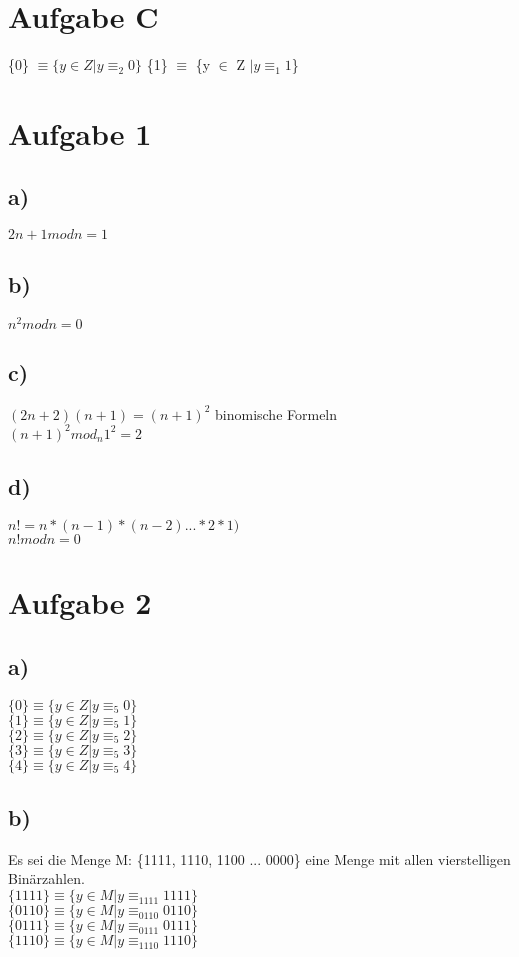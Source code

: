 \documentclass{article}
\begin{document}
	\section*{Aufgabe C}
	\{0\} $\equiv \{y \in Z | y \equiv_2 0 \}$
	\{1\} $\equiv$ \{y $\in$ Z $| y \equiv_1 1$\}
	
	\section*{Aufgabe 1}
	\subsection*{a)}
	$2n+1 mod n = 1$
	\subsection*{b)}
	$n^2 mod n = 0$
	\subsection*{c)}
	$(2n+2)(n+1) = (n+1)^2$ binomische Formeln \\
	$(n+1)^2 mod_n 1^2 = 2$
	\subsection*{d)}
	$n! = n * (n-1) * (n-2) ... * 2 * 1)$ \\
	$n! mod n = 0$
	\section*{Aufgabe 2}
	\subsection*{a)}
	$\{0\} \equiv \{y \in Z | y \equiv_5 0\}$ \\
	$\{1\} \equiv \{y \in Z | y \equiv_5 1\}$ \\
	$\{2\} \equiv \{y \in Z | y \equiv_5 2\}$ \\
	$\{3\} \equiv \{y \in Z | y \equiv_5 3\}$ \\
	$\{4\} \equiv \{y \in Z | y \equiv_5 4\}$ \\
	\subsection*{b)}
	Es sei die Menge M: \{1111, 1110, 1100 ... 0000\} eine Menge mit allen vierstelligen Binärzahlen. \\
	$\{1111\} \equiv \{y \in M | y \equiv_{1111}  1111\}$ \\
	$\{0110\} \equiv \{y \in M | y \equiv_{0110}  0110\}$ \\
	$\{0111\} \equiv \{y \in M | y \equiv_{0111}  0111\}$ \\
	$\{1110\} \equiv \{y \in M | y \equiv_{1110}  1110\}$ \\
\end{document}
